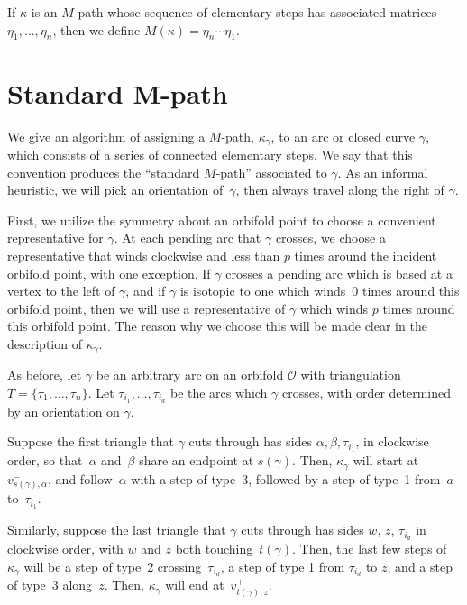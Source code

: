 \documentclass[11pt]{article}
\numberwithin{equation}{section}
\begin{document}
\begin{Definition}If $\kappa$ is an $M$-path whose sequence of elementary steps has associated matrices $\eta_1,\ldots, \eta_n$, then we define $M(\kappa) = \eta_n \cdots \eta_1$.
\end{Definition}

\section[Standard $M$-path]{Standard $\boldsymbol{M}$-path}\label{sec:StandardMPath}

We give an algorithm of assigning a $M$-path, $\kappa_\gamma$, to an arc or closed curve $\gamma$, which consists of a series of connected elementary steps. We say that this convention produces the ``standard $M$-path'' associated to $\gamma$. As an informal heuristic, we will pick an orientation of~$\gamma$, then always travel along the right of $\gamma$.

First, we utilize the symmetry about an orbifold point to choose a convenient representative for $\gamma$. At each pending arc that $\gamma$ crosses, we choose a representative that winds clockwise and less than $p$ times around the incident orbifold point, with one exception. If $\gamma$ crosses a pending arc which is based at a vertex to the left of $\gamma$, and if $\gamma$ is isotopic to one which winds~0 times around this orbifold point, then we will use a representative of $\gamma$ which winds $p$ times around this orbifold point. The reason why we choose this will be made clear in the description of $\kappa_\gamma$.

As before, let $\gamma$ be an arbitrary arc on an orbifold $\mathcal{O}$ with triangulation $T = \{\tau_1,\ldots, \tau_n\}$. Let $\tau_{i_1},\ldots, \tau_{i_d}$ be the arcs which $\gamma$ crosses, with order determined by an orientation on $\gamma$.

Suppose the first triangle that $\gamma$ cuts through has sides $\alpha,\beta,\tau_{i_1}$, in clockwise order, so that~$\alpha$ and~$\beta$ share an endpoint at $s(\gamma)$. Then, $\kappa_\gamma$ will start at $v_{s(\gamma),\alpha}^-$, and follow~$\alpha$ with a step of type~3, followed by a step of type~1 from~$a$ to~$\tau_{i_1}$.

Similarly, suppose the last triangle that $\gamma$ cuts through has sides $w$, $z$, $\tau_{i_d}$ in clockwise order, with $w$ and $z$ both touching~$t(\gamma)$. Then, the last few steps of $\kappa_\gamma$ will be a step of type~2 crossing~$\tau_{i_d}$, a step of type 1 from $\tau_{i_d}$ to $z$, and a step of type~3 along~$z$. Then, $\kappa_\gamma$ will end at~$v^+_{t(\gamma),z}$.
\end{document}
